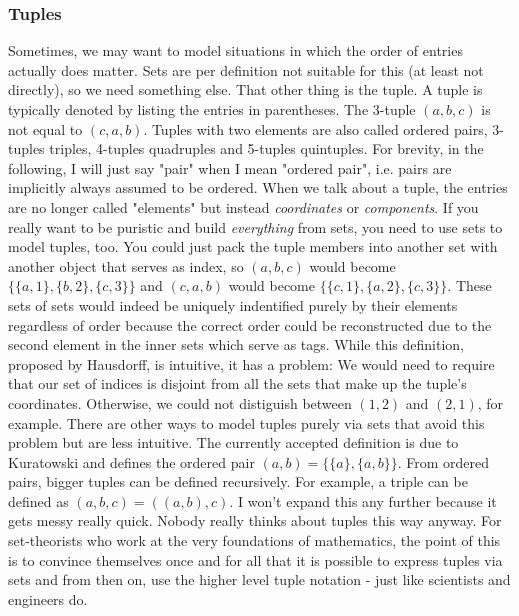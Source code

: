 


\subsubsection{Tuples}
Sometimes, we may want to model situations in which the order of entries actually does matter. Sets are per definition not suitable for this (at least not directly), so we need something else. That other thing is the tuple. A tuple is typically denoted by listing the entries in parentheses. The 3-tuple $(a,b,c)$ is not equal to $(c,a,b)$. Tuples with two elements are also called ordered pairs, 3-tuples triples, 4-tuples quadruples and 5-tuples quintuples. For brevity, in the following, I will just say "pair" when I mean "ordered pair", i.e. pairs are implicitly always assumed to be ordered. When we talk about a tuple, the entries are no longer called "elements" but instead \emph{coordinates} or \emph{components}. If you really want to be puristic and build \emph{everything} from sets, you need to use sets to model tuples, too. You could just pack the tuple members into another set with another object that serves as index, so $(a,b,c)$ would become $\{\{a,1\},\{b,2\},\{c,3\}\}$ and $(c,a,b)$ would become  $\{\{c,1\},\{a,2\},\{c,3\}\}$. These sets of sets would indeed be uniquely indentified purely by their elements regardless of order because the correct order could be reconstructed due to the second element in the inner sets which serve as tags. While this definition, proposed by Hausdorff, is intuitive, it has a problem: We would need to require that our set of indices is disjoint from all the sets that make up the tuple's coordinates. Otherwise, we could not distiguish between $(1,2)$ and $(2,1)$, for example. There are other ways to model tuples purely via sets that avoid this problem but are less intuitive. The currently accepted definition is due to Kuratowski and defines the ordered pair $(a,b) = \{ \{a\}, \{a,b\} \}$. From ordered pairs, bigger tuples can be defined recursively. For example, a triple can be defined as $(a,b,c) = ((a,b),c)$. I won't expand this any further because it gets messy really quick. Nobody really thinks about tuples this way anyway. For set-theorists who work at the very foundations of mathematics, the point of this is to convince themselves once and for all that it is possible to express tuples via sets and from then on, use the higher level tuple notation - just like scientists and engineers do. 

